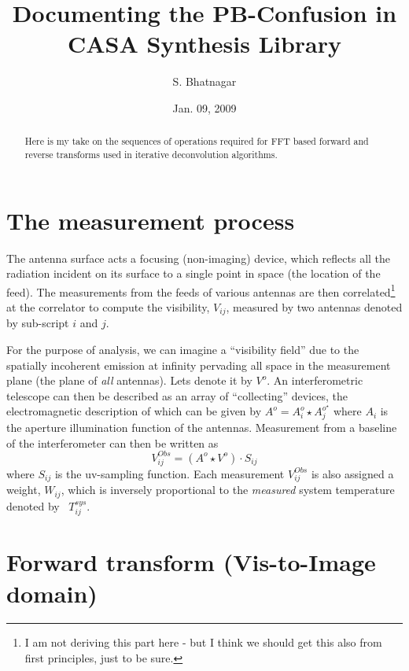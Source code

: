 \documentclass[11pt,epsf]{article}
\begin{document}
\title{Documenting the PB-Confusion in CASA Synthesis Library}
\author{S. Bhatnagar}
\date{Jan. 09, 2009}
\maketitle

\normalsize

\begin{abstract}
Here is my take on the sequences of operations required for FFT based
forward and reverse transforms used in iterative deconvolution
algorithms.
\end{abstract}

\section{The measurement process}

The antenna surface acts a focusing (non-imaging) device, which
reflects all the radiation incident on its surface to a single point
in space (the location of the feed).  The measurements from the feeds
of various antennas are then correlated\footnote{I am not deriving
this part here - but I think we should get this also from first
principles, just to be sure.} at the correlator to compute the
visibility, $V_{ij}$, measured by two antennas denoted by sub-script
$i$ and $j$.

For the purpose of analysis, we can imagine a ``visibility field'' due
to the spatially incoherent emission at infinity pervading all space
in the measurement plane (the plane of {\it all} antennas).  Lets
denote it by $V^o$.  An interferometric telescope can then be
described as an array of ``collecting'' devices, the electromagnetic
description of which can be given by $A^o=A^o_i \star
A^{o^\star}_j$ where $A_i$ is the aperture illumination function of
the antennas.  Measurement from a baseline of the interferometer can
then be written as
\begin{equation}
 V_{ij}^{Obs} = (A^o \star V^o) \cdot S_{ij}
\end{equation}
where $S_{ij}$ is the uv-sampling function.  Each measurement
$V_{ij}^{Obs}$ is also assigned a weight, $W_{ij}$, which is inversely
proportional to the {\it measured} system temperature denoted by~
$T_{ij}^{sys}$.

\section{Forward transform (Vis-to-Image domain)}
\end{document}
